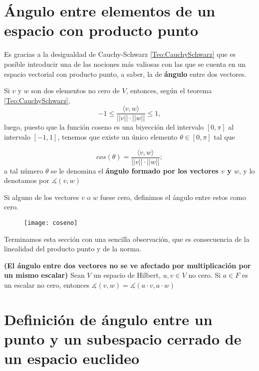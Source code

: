 \section{Ángulo entre elementos de un espacio con producto punto}
\label{angulo entre elementos de un espacio con producto punto}

Es gracias a la desigualdad de Cauchy-Schwarz
\eqref{Teo:CauchySchwarz}
que es posible introducir una de las nociones
más valiosas con las que se cuenta en un espacio
vectorial con producto punto, a saber, la de \textbf{ángulo} entre dos
vectores.

Si $v$ y $w$ son dos elementos no cero de $V$, entonces,
según el teorema \ref{Teo:CauchySchwarz},
\[
-1 \leq \frac{\langle v, w \rangle}{||v|| \cdot ||w||} \leq 1,
\]
luego, puesto que la función coseno es una biyección
del intervalo $[0, \pi]$ al intervalo $[-1,1]$,
tenemos que existe un único elemento 
$\theta \in [0, \pi]$ tal que

\[
cos(\theta)= \frac{\langle v, w \rangle}{||v|| \cdot ||w||};
\]
a tal número $\theta$ se le denomina el 
\textbf{ángulo formado por los vectores $v$ y $w$},
y lo denotamos por $\measuredangle (v, w)$

Si alguno de los vectores $v$ o $w$ fuese cero, definimos
el ángulo entre estos como cero.

\begin{figure}[H]
	\centering
	\texttt{[image: coseno]} 
\end{figure}	


Terminamos esta sección con una sencilla observación, que es 
consecuencia de la linealidad del producto punto y de la norma.

\begin{obs}
\label{obs: angulo se preserva por mult. esc.}
\textbf{(El ángulo entre dos vectores no se ve afectado
por multiplicación por un mismo escalar)}
Sean $V$ un espacio de Hilbert, $u, v \in V$ no cero.
Si $a \in F$ es un escalar no cero, entonces
$\measuredangle (v, w) = \measuredangle (a \cdot v, a \cdot w)$
\end{obs}

\section{Definición de ángulo entre un punto y un subespacio cerrado de un espacio euclideo}
\label{sec: def del angulo entre un punto y un subespacio cerrado}

